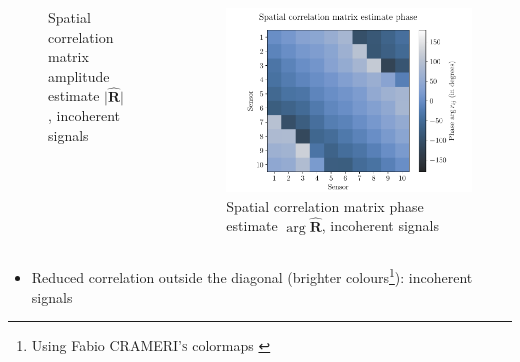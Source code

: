 \documentclass[UKenglish,8pt,aspectratio=1610]{beamer}
\begin{document}
\begin{frame}
\begin{columns}
\begin{column}{0.5\textwidth}
\begin{figure}[h!]
				\caption{Spatial correlation matrix amplitude estimate $\rvert \boldsymbol{\hat{\mathbf{R}}}\rvert$, incoherent signals}
			\end{figure}
		\end{column}
		\begin{column}{0.5\textwidth}
	\begin{figure}[h!]
	\centering
	\includegraphics[scale=0.37]{question1/part_A_question_1_autocorrelation_matrix_phase.pdf}
	\caption{Spatial correlation matrix phase estimate $\arg \boldsymbol{\hat{\mathbf{R}}}$, incoherent signals}
\end{figure}
		\end{column}
	\end{columns} 
\vspace{-10pt}
	\begin{itemize}
	\item Reduced correlation outside the diagonal (brighter colours\footnote{Using Fabio \textsc{CRAMERI's} colormaps \cite{fabio}}): incoherent signals
\end{itemize}
	\end{frame}
	
\end{document}
